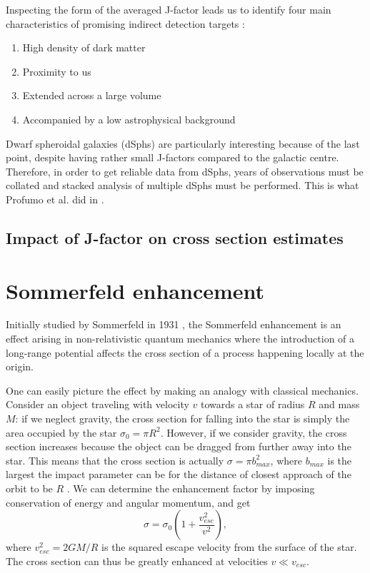 Inspecting the form of the averaged J-factor leads us to identify four main characteristics of promising indirect detection targets \cite{Hooper_2018}:
\begin{enumerate}
	\item High density of dark matter
	\item Proximity to us
	\item Extended across a large volume
	\item Accompanied by a low astrophysical background
\end{enumerate}
Dwarf spheroidal galaxies (dSphs) are particularly interesting because of the last point, despite having rather small J-factors compared to the galactic centre. Therefore, in order to get reliable data from dSphs, years of observations must be collated and stacked analysis of multiple dSphs must be performed. This is what Profumo et al. did in \cite{Profumo_2018}.

\subsection{Impact of J-factor on cross section estimates}

\section{Sommerfeld enhancement}

Initially studied by Sommerfeld in 1931 \cite{Sommerfeld_1931}, the Sommerfeld enhancement is an effect arising in non-relativistic quantum mechanics where the introduction of a long-range potential affects the cross section of a process happening locally at the origin.

One can easily picture the effect by making an analogy with classical mechanics. Consider an object traveling with velocity \(v\) towards a star of radius \(R\) and mass \(M\): if we neglect gravity, the cross section for falling into the star is simply the area occupied by the star \(\sigma _0=\pi R^2\). However, if we consider gravity, the cross section increases because the object can be dragged from further away into the star. This means that the cross section is actually \(\sigma = \pi b_{max}^2 \), where \(b_{max}\) is the largest the impact parameter can be for the distance of closest approach of the orbit to be \(R\) \cite{Arkani_2009, Cirelli_2024}. We can determine the enhancement factor by imposing conservation of energy and angular momentum, and get
\begin{equation}
	\sigma = \sigma _0 \left( 1+ \frac{v_{esc} ^2}{v ^2} \right), 
\end{equation}
where \(v_{esc} ^2 = 2GM / R\) is the squared escape velocity from the surface of the star. The cross section can thus be greatly enhanced at velocities \(v \ll v_{esc} \).

